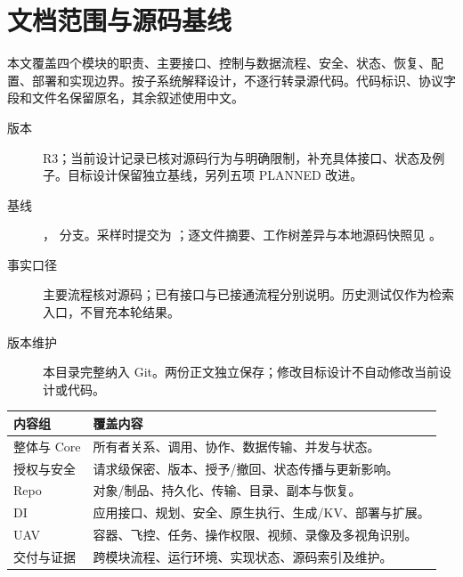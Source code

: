 \section{文档范围与源码基线}
本文覆盖四个模块的职责、主要接口、控制与数据流程、安全、状态、恢复、配置、部署和实现边界。按子系统解释设计，不逐行转录源代码。代码标识、协议字段和文件名保留原名，其余叙述使用中文。

\begin{description}
\item[版本] R3；当前设计记录已核对源码行为与明确限制，补充具体接口、状态及例子。目标设计保留独立基线，另列五项 PLANNED 改进。
\item[基线] \SnapshotDate， 分支。采样时提交为 \texttt{\SourceBaseline}；逐文件摘要、工作树差异与本地源码快照见 。
\item[事实口径] 主要流程核对源码；已有接口与已接通流程分别说明。历史测试仅作为检索入口，不冒充本轮结果。
\item[版本维护] 本目录完整纳入 Git。两份正文独立保存；修改目标设计不自动修改当前设计或代码。
\end{description}

\begin{tabularx}{\linewidth}{@{}p{30mm}X@{}}
\toprule
内容组 & 覆盖内容 \\
\midrule
整体与 Core & 所有者关系、调用、协作、数据传输、并发与状态。\\
授权与安全 & 请求级保密、版本、授予/撤回、状态传播与更新影响。\\
Repo & 对象/制品、持久化、传输、目录、副本与恢复。\\
DI & 应用接口、规划、安全、原生执行、生成/KV、部署与扩展。\\
UAV & 容器、飞控、任务、操作权限、视频、录像及多视角识别。\\
交付与证据 & 跨模块流程、运行环境、实现状态、源码索引及维护。\\
\bottomrule
\end{tabularx}


\newpage

